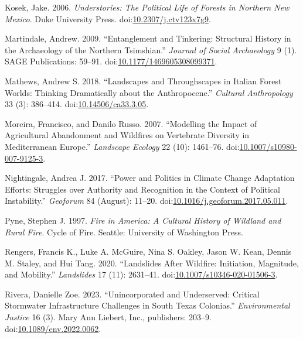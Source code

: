 \documentclass[
]{article}
\newlength{\cslhangindent}
\newenvironment{CSLReferences}[2] %
 {\begin{list}{}{%
  \setlength{\itemindent}{0pt}
  \setlength{\leftmargin}{0pt}
  \setlength{\parsep}{0pt}
  \ifodd #1
   \setlength{\leftmargin}{\cslhangindent}
   \setlength{\itemindent}{-1\cslhangindent}
  \fi
  \setlength{\itemsep}{#2\baselineskip}}}
 {\end{list}}
\begin{document}
\begin{CSLReferences}{1}{0}
Kosek, Jake. 2006. \emph{Understories: {The Political Life} of {Forests} in {Northern New Mexico}}. Duke University Press. doi:\href{https://doi.org/10.2307/j.ctv123x7g9}{10.2307/j.ctv123x7g9}.

Martindale, Andrew. 2009. {``Entanglement and Tinkering: {Structural} History in the Archaeology of the {Northern Tsimshian}.''} \emph{Journal of Social Archaeology} 9 (1). SAGE Publications: 59--91. doi:\href{https://doi.org/10.1177/1469605308099371}{10.1177/1469605308099371}.

Mathews, Andrew S. 2018. {``Landscapes and {Throughscapes} in {Italian Forest Worlds}: {Thinking Dramatically} about the {Anthropocene}.''} \emph{Cultural Anthropology} 33 (3): 386--414. doi:\href{https://doi.org/10.14506/ca33.3.05}{10.14506/ca33.3.05}.

Moreira, Francisco, and Danilo Russo. 2007. {``Modelling the Impact of Agricultural Abandonment and Wildfires on Vertebrate Diversity in {Mediterranean Europe}.''} \emph{Landscape Ecology} 22 (10): 1461--76. doi:\href{https://doi.org/10.1007/s10980-007-9125-3}{10.1007/s10980-007-9125-3}.

Nightingale, Andrea J. 2017. {``Power and Politics in Climate Change Adaptation Efforts: {Struggles} over Authority and Recognition in the Context of Political Instability.''} \emph{Geoforum} 84 (August): 11--20. doi:\href{https://doi.org/10.1016/j.geoforum.2017.05.011}{10.1016/j.geoforum.2017.05.011}.

Pyne, Stephen J. 1997. \emph{Fire in {America}: A Cultural History of Wildland and Rural Fire}. Cycle of Fire. Seattle: University of Washington Press.

Rengers, Francis K., Luke A. McGuire, Nina S. Oakley, Jason W. Kean, Dennis M. Staley, and Hui Tang. 2020. {``Landslides After Wildfire: Initiation, Magnitude, and Mobility.''} \emph{Landslides} 17 (11): 2631--41. doi:\href{https://doi.org/10.1007/s10346-020-01506-3}{10.1007/s10346-020-01506-3}.

Rivera, Danielle Zoe. 2023. {``Unincorporated and {Underserved}: {Critical Stormwater Infrastructure Challenges} in {South Texas Colonias}.''} \emph{Environmental Justice} 16 (3). Mary Ann Liebert, Inc., publishers: 203--9. doi:\href{https://doi.org/10.1089/env.2022.0062}{10.1089/env.2022.0062}.


\end{CSLReferences}
\end{document}
